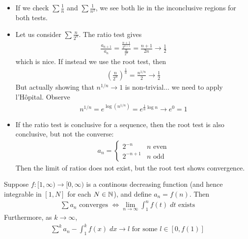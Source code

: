 \documentclass{../../template/note}
\begin{document}
    \begin{example}
        \begin{itemize}
            \item If we check \(\sum \frac 1 n\) and \(\sum \frac 1 {n^2}\), we see both lie in the inconclusive regions for both tests.
            \item Let us consider \(\sum \frac{n}{2^n}\). The ratio test gives
            \begin{align*}
                \frac{a_{n+1}}{a_n} = \frac{\frac{n+1}{2^{n+1}}}{\frac{n}{2^n}} = \frac{n+1}{2n} \to \frac 1 2
            \end{align*}
            which is nice. If instead we use the root test, then
            \begin{align*}
                \left(\frac n {2^n}\right)^{\frac 1 n} = \frac{n^{1/n}}{2} \to \frac 1 2
            \end{align*}
            But actually showing that \(n^{1/n} \to 1\) is non-trivial... we need to apply l'H\^opital. Observe
            \begin{align*}
                n^{1/n} = e^{\log(n^{1/n})} = e^{\frac 1 n \log n} \to e^0 = 1
            \end{align*}
            
            
            \item If the ratio test is conclusive for a sequence, then the root test is also conclusive, but not the converse:
            \begin{align*}
                a_n = \begin{cases}
                    2^{-n} & n \text{ even} \\
                    2^{-n+1} & n \text{ odd}
                \end{cases}
            \end{align*}
            Then the limit of ratios does not exist, but the root test shows convergence.            
        \end{itemize}
    \end{example}
    

    \begin{proposition}
        Suppose \(f: [1, \infty) \to [0, \infty)\) is a continous decreasing function (and hence integrable in \([1, N]\) for each \(N \in \mathbb N\)), and define \(a_n = f(n)\). Then
        \begin{align*}
            \sum a_n \text{ converges } \iff \lim_{n \to \infty} \int_1^n f(t) \; dt \text{ exists}
        \end{align*}
        Furthermore, as \(k \to \infty\),
        \begin{align*}
            \sum^k a_n - \int_1^k f(x) \; dx \to l \text{ for some }l \in [0, f(1)]
        \end{align*}        
    \end{proposition}
\end{document}
